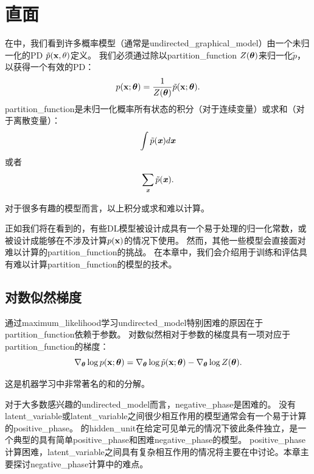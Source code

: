 \chapter{直面}
\label{chap:confronting_the_partition_function}
在中，我们看到许多概率模型（通常是\gls{undirected_graphical_model}）由一个未归一化的\gls{PD} $\tilde{p}(\mathbf{x}, \theta)$定义。
我们必须通过除以\gls{partition_function} $Z(\boldsymbol{\theta})$来归一化$\tilde{p}$，以获得一个有效的\gls{PD}：
\begin{equation}
	p(\mathbf{x}; \boldsymbol{\theta}) = \frac{1}{Z(\boldsymbol{\theta})} \tilde{p}(\mathbf{x}; \boldsymbol{\theta}).
\end{equation}
\gls{partition_function}是未归一化概率所有状态的积分（对于连续变量）或求和（对于离散变量）：
\begin{equation}
	\int \tilde{p}(\boldsymbol{\mathit{x}}) d \boldsymbol{\mathit{x}}
\end{equation}
或者
\begin{equation}
	\sum_{\boldsymbol{\mathit{x}}} \tilde{p} (\boldsymbol{\mathit{x}}).
\end{equation}


对于很多有趣的模型而言，以上积分或求和难以计算。


正如我们将在看到的，有些\gls{DL}模型被设计成具有一个易于处理的归一化常数，或被设计成能够在不涉及计算$p(\mathbf{x})$的情况下使用。
然而，其他一些模型会直接面对难以计算的\gls{partition_function}的挑战。
在本章中，我们会介绍用于训练和评估具有难以计算\gls{partition_function}的模型的技术。


\section{对数似然梯度}
\label{sec:the_log_likelihood_gradient}
通过\gls{maximum_likelihood}学习\gls{undirected_model}特别困难的原因在于\gls{partition_function}依赖于参数。
对数似然相对于参数的梯度具有一项对应于\gls{partition_function}的梯度：
\begin{equation}
	\nabla_{\boldsymbol{\theta}} \log p(\mathbf{x}; \boldsymbol{\theta}) = \nabla_{\boldsymbol{\theta}} \log \tilde{p}(\mathbf{x}; \boldsymbol{\theta}) -
\nabla_{\boldsymbol{\theta}} \log Z(\boldsymbol{\theta}).
\end{equation}

这是机器学习中非常著名的和的分解。


对于大多数感兴趣的\gls{undirected_model}而言，\gls{negative_phase}是困难的。
没有\gls{latent_variable}或\gls{latent_variable}之间很少相互作用的模型通常会有一个易于计算的\gls{positive_phase}。
的\gls{hidden_unit}在给定可见单元的情况下彼此条件独立，是一个典型的具有简单\gls{positive_phase}和困难\gls{negative_phase}的模型。
\gls{positive_phase}计算困难，\gls{latent_variable}之间具有复杂相互作用的情况将主要在中讨论。本章主要探讨\gls{negative_phase}计算中的难点。



